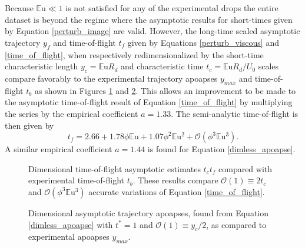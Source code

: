 \documentclass[aip,reprint, floatfix]{revtex4-1}
\begin{document}
Because $\mathbb{E}\mbox{u} \ll 1$ is not satisfied for any of the experimental drops the entire dataset is beyond the regime where the asymptotic results for short-times given by Equation \ref{perturb_image} are valid. However, the long-time scaled asymptotic trajectory   $y_f$ and time-of-flight $t_f$ given by Equations \ref{perturb_viscous} and \ref{time_of_flight}, when respectively redimensionalized by the short-time characteristic length $y_c=\mathbb{E}\mbox{u} R_d$ and characteristic time $t_c=\mathbb{E}\mbox{u} R_d / U_0$ scales compare favorably to the experimental trajectory apoapses $y_{max}$ and time-of-flight $t_b$ as shown in Figures \ref{fig:times2} and \ref{fig:ymaxes}. This allows an improvement to be made to the asymptotic time-of-flight result of Equation \ref{time_of_flight} by multiplying the series by the empirical coefficient $a = 1.33$. The semi-analytic time-of-flight is then given by
\begin{equation}
\label{time_improved}
t_f = 2.66 + 1.78\phi\mathbb{E}\mbox{u} + 1.07\phi^2\mathbb{E}\mbox{u}^{2} + \mathcal{O}(\phi^3\mathbb{E}\mbox{u}^{3}).
\end{equation}
A similar empirical coefficient $a = 1.44$ is found for Equation \ref{dimless_apoapse}.

\begin{figure}[htb]
    \centering
    \resizebox{0.5\textwidth}{!}{}
    \caption{Dimensional time-of-flight asymptotic estimates $t_c t_f$ compared with experimental time-of-flight $t_b$. These results compare $\mathcal{O}(1) \equiv 2 t_c$ and $\mathcal{O}(\phi^3\mathbb{E}\mbox{u}^{3})$ accurate variations of Equation \ref{time_of_flight}. \label{fig:times2}}
\end{figure}
\begin{figure}[htb]
    \centering
    \resizebox{0.5\textwidth}{!}{}
    \caption{Dimensional asymptotic trajectory apoapses, found from Equation \ref{dimless_apoapse} with $t^*=1$ and $\mathcal{O}(1) \equiv y_c/2$, as compared to experimental apoapses $y_{max}$. \label{fig:ymaxes}}
\end{figure}
\end{document}
